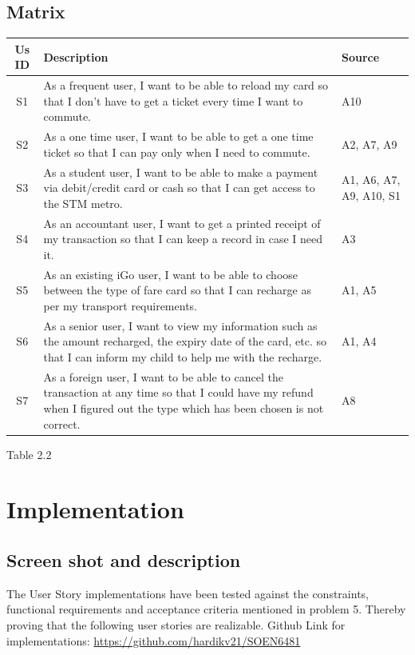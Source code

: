 \documentclass[12pt]{report}
\begin{document}
\section{Matrix}
\begin{tabular}{|c|p{9cm}<{\centering}|p{6cm}<{\centering}|}
\hline
\textbf{Us ID}&\textbf{Description}&\textbf{Source}\\
\hline
S1
&As a frequent user, I want to be able to reload my card so that I don't have to get a ticket every time I want to commute.
&A10
\\
\hline
S2
&As a one time user, I want to be able to get a one time ticket so that I can pay only when I need to commute.
&A2, A7, A9
\\
\hline
S3
&As a student user, I want to be able to make a payment via debit/credit card or cash so that I can get access to the STM metro.
&A1, A6, A7, A9, A10, S1
\\
\hline
S4
&As an accountant user, I want to get a printed receipt of my transaction so that I can keep a record in case I need it.
&A3
\\
\hline
S5
&As an existing iGo user, I want to be able to choose between the type of fare card so that I can recharge as per my transport requirements.
&A1, A5
\\
\hline
S6
&As a senior user, I want to view my information such as the amount recharged, the expiry date of the card, etc. so that I can inform my child to help me with the recharge.
&A1, A4
\\
\hline
S7
&As a foreign user, I want to be able to cancel the transaction at any time so that I could have my refund when I figured out the type which has been chosen is not correct.
&A8
\\
\hline
\end{tabular}
\begin{center}
Table 2.2
\end{center}

\chapter{Implementation}

\FloatBarrier
\section{Screen shot and description}
The User Story implementations have been tested against the constraints, functional requirements and acceptance criteria mentioned in problem 5. Thereby proving that the following user stories are realizable.
\newline
Github Link for implementations: \href{https://github.com/hardikv21/SOEN6481}{https://github.com/hardikv21/SOEN6481}
\end{document}
